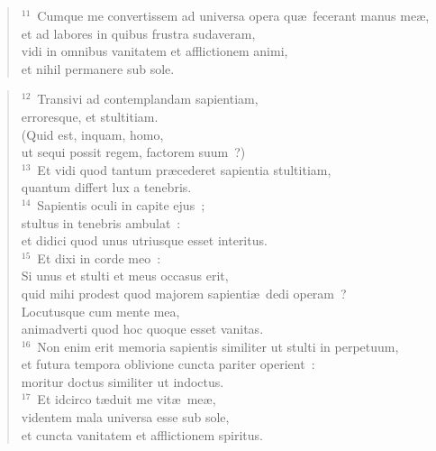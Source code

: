 \begin{flushleft}
\begin{verse}
${}^{11}$~Cumque me convertissem ad universa opera qu\ae\ fecerant manus me\ae ,\\ et ad labores in quibus frustra sudaveram,\\ vidi in omnibus vanitatem et afflictionem animi,\\ et nihil permanere sub sole.\end{verse}\end{flushleft}


\begin{flushleft}\begin{verse}${}^{12}$~Transivi ad contemplandam sapientiam,\\ erroresque, et stultitiam.\\ (Quid est, inquam, homo,\\ ut sequi possit regem, factorem suum~?)\\
${}^{13}$~Et vidi quod tantum pr\ae cederet sapientia stultitiam,\\ quantum differt lux a tenebris.\\
${}^{14}$~Sapientis oculi in capite ejus~;\\ stultus in tenebris ambulat~:\\ et didici quod unus utriusque esset interitus.\\
${}^{15}$~Et dixi in corde meo~:\\ Si unus et stulti et meus occasus erit,\\ quid mihi prodest quod majorem sapienti\ae\ dedi operam~?\\ Locutusque cum mente mea,\\ animadverti quod hoc quoque esset vanitas.\\
${}^{16}$~Non enim erit memoria sapientis similiter ut stulti in perpetuum,\\ et futura tempora oblivione cuncta pariter operient~:\\ moritur doctus similiter ut indoctus.\\
${}^{17}$~Et idcirco t\ae duit me vit\ae\ me\ae ,\\ videntem mala universa esse sub sole,\\ et cuncta vanitatem et afflictionem spiritus.\end{verse}\end{flushleft}


